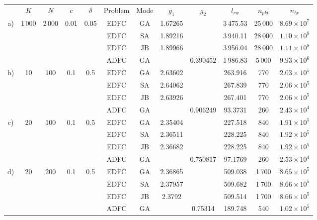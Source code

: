 \documentclass[12pt,journal,draftclsnofoot,onecolumn]{IEEEtran}
\renewcommand{\arraystretch}{2}
\begin{document}
\begin{table}[h]
	\centering
	\renewcommand{\arraystretch}{0.9}
	\begin{tabular}{c c c c c c c c c c c c} \toprule
		& $K$ & $N$ & $c$ & $\delta$ &Problem & Mode & $g_1$ & $g_2$ & $l_{rw}$ & $n_{pkt}$ & $n_{tx}$ \\ \cmidrule{2-12}
		\multirow{4}{*}{a)} & \multirow{4}{*}{1\,000} & \multirow{4}{*}{2\,000} & \multirow{4}{*}{0.01} & \multirow{4}{*}{0.05}
						&EDFC & GA & 1.67265 &  & 3\,475.53 & 25\,000 & $8.69 \times 10^7$ \\
		&&&& &EDFC & SA & 1.89216 &  & 3\,940.11 & 28\,000 & $1.10 \times 10^8$ \\
		&&&& &EDFC & JB & 1.89966 &  & 3\,956.04 & 28\,000 & $1.11 \times 10^8$ \\
		&&&& &ADFC & GA &  & 0.390452 & 1\,986.83 & 5\,000 & $9.93 \times 10^6$ \\ \cmidrule{2-12}
		\multirow{4}{*}{b)} & \multirow{4}{*}{10} & \multirow{4}{*}{100} & \multirow{4}{*}{0.1} & \multirow{4}{*}{0.5}
						&EDFC & GA & 2.63602 &  & 263.916 & 770 & $2.03 \times 10^5$ \\
		&&&& &EDFC & SA & 2.64062 &  & 267.839 & 770 & $2.06 \times 10^5$ \\
		&&&& &EDFC & JB & 2.63926 &  & 267.401 & 770 & $2.06 \times 10^5$ \\
		&&&& &ADFC & GA &  & 0.906249 & 93.3731 & 260 & $2.43 \times 10^4$ \\ \cmidrule{2-12}
		\multirow{4}{*}{c)} & \multirow{4}{*}{20} & \multirow{4}{*}{100} & \multirow{4}{*}{0.1} & \multirow{4}{*}{0.5}
						&EDFC & GA & 2.35404 &  & 227.518 & 840 & $1.91 \times 10^5$ \\
		&&&& &EDFC & SA & 2.36511 &  & 228.225 & 840 & $1.92 \times 10^5$ \\
		&&&& &EDFC & JB & 2.36682 &  & 228.225 & 840 & $1.92 \times 10^5$ \\
		&&&& &ADFC & GA &  & 0.750817 & 97.1769 & 260 & $2.53 \times 10^4$ \\ \cmidrule{2-12}
		\multirow{4}{*}{d)} & \multirow{4}{*}{20} & \multirow{4}{*}{200} & \multirow{4}{*}{0.1} & \multirow{4}{*}{0.5}
						&EDFC & GA & 2.36865 &  & 509.038 & 1\,700 & $8.65 \times 10^5$ \\
		&&&& &EDFC & SA & 2.37957 &  & 509.682 & 1\,700 & $8.66 \times 10^5$ \\
		&&&& &EDFC & JB & 2.3792 &  & 509.514 & 1\,700 & $8.66 \times 10^5$ \\
		&&&& &ADFC & GA &  & 0.75314 & 189.748 & 540 & $1.02 \times 10^5$ \\ \cmidrule{2-12}

\end{tabular}
\end{table}
\end{document}
